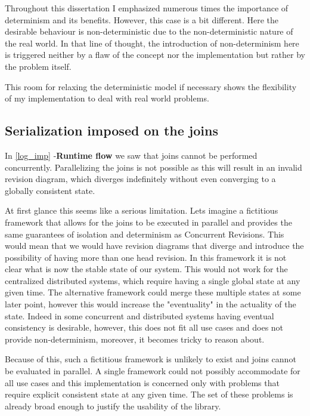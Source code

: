 \documentclass[12pt,twoside,notitlepage]{report}
\begin{document}
Throughout this dissertation I emphasized numerous times the importance of determinism and its benefits. However, this case is a bit different. Here the desirable behaviour is non-deterministic due to the non-deterministic nature of the real world. In that line of thought, the introduction of non-determinism here is triggered neither by a flaw of the concept nor the implementation but rather by the problem itself. 

This room for relaxing the deterministic model if necessary shows the flexibility of my implementation to deal with real world problems. 

\subsection{Serialization imposed on the joins}
\label{eval_join}
In \ref{log_imp} -{\bfseries Runtime flow} we saw that joins cannot be performed concurrently. Parallelizing the joins is not possible as this will result in an invalid revision diagram, which diverges indefinitely without even converging to a globally consistent state.

At first glance this seems like a  serious limitation. Lets imagine a fictitious framework that allows for the joins to be executed in parallel and provides the same guarantees of isolation and determinism as Concurrent Revisions. This would mean that we would have revision diagrams that diverge and introduce the possibility of having more than one head revision. In this framework it is not clear what is now the stable state of our system. This would not work for the centralized distributed systems, which require having a single global state at any given time. The alternative framework could merge these multiple states at some later point, however this would increase the "eventuality" in the actuality of the state. Indeed in some concurrent and distributed systems having eventual consistency is desirable\cite{bacon}, however, this does not fit all use cases and does not provide non-determinism, moreover, it becomes tricky to reason about.

Because of this, such a fictitious framework is unlikely to exist and joins cannot be evaluated in parallel. A single framework could not possibly accommodate for all use cases and this implementation is concerned only with problems that require explicit consistent state at any given time. The set of these problems is already broad enough to justify the usability of the library.      
\end{document}

